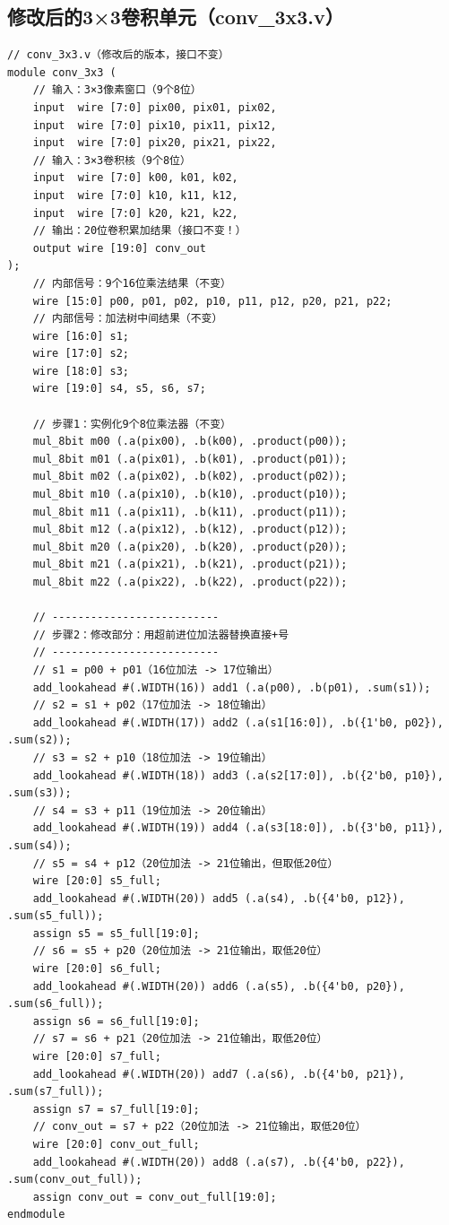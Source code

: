 \documentclass{ctexart}
\begin{document}
\subsection{修改后的3×3卷积单元（conv\_3x3.v）}
\begin{lstlisting}[style=verilog, caption=conv\_3x3.v]
// conv_3x3.v（修改后的版本，接口不变）
module conv_3x3 (
    // 输入：3×3像素窗口（9个8位）
    input  wire [7:0] pix00, pix01, pix02,
    input  wire [7:0] pix10, pix11, pix12,
    input  wire [7:0] pix20, pix21, pix22,
    // 输入：3×3卷积核（9个8位）
    input  wire [7:0] k00, k01, k02,
    input  wire [7:0] k10, k11, k12,
    input  wire [7:0] k20, k21, k22,
    // 输出：20位卷积累加结果（接口不变！）
    output wire [19:0] conv_out
);
    // 内部信号：9个16位乘法结果（不变）
    wire [15:0] p00, p01, p02, p10, p11, p12, p20, p21, p22;
    // 内部信号：加法树中间结果（不变）
    wire [16:0] s1;
    wire [17:0] s2;
    wire [18:0] s3;
    wire [19:0] s4, s5, s6, s7;

    // 步骤1：实例化9个8位乘法器（不变）
    mul_8bit m00 (.a(pix00), .b(k00), .product(p00));
    mul_8bit m01 (.a(pix01), .b(k01), .product(p01));
    mul_8bit m02 (.a(pix02), .b(k02), .product(p02));
    mul_8bit m10 (.a(pix10), .b(k10), .product(p10));
    mul_8bit m11 (.a(pix11), .b(k11), .product(p11));
    mul_8bit m12 (.a(pix12), .b(k12), .product(p12));
    mul_8bit m20 (.a(pix20), .b(k20), .product(p20));
    mul_8bit m21 (.a(pix21), .b(k21), .product(p21));
    mul_8bit m22 (.a(pix22), .b(k22), .product(p22));

    // --------------------------
    // 步骤2：修改部分：用超前进位加法器替换直接+号
    // --------------------------
    // s1 = p00 + p01（16位加法 -> 17位输出）
    add_lookahead #(.WIDTH(16)) add1 (.a(p00), .b(p01), .sum(s1));
    // s2 = s1 + p02（17位加法 -> 18位输出）
    add_lookahead #(.WIDTH(17)) add2 (.a(s1[16:0]), .b({1'b0, p02}), .sum(s2));
    // s3 = s2 + p10（18位加法 -> 19位输出）
    add_lookahead #(.WIDTH(18)) add3 (.a(s2[17:0]), .b({2'b0, p10}), .sum(s3));
    // s4 = s3 + p11（19位加法 -> 20位输出）
    add_lookahead #(.WIDTH(19)) add4 (.a(s3[18:0]), .b({3'b0, p11}), .sum(s4));
    // s5 = s4 + p12（20位加法 -> 21位输出，但取低20位）
    wire [20:0] s5_full;
    add_lookahead #(.WIDTH(20)) add5 (.a(s4), .b({4'b0, p12}), .sum(s5_full));
    assign s5 = s5_full[19:0];
    // s6 = s5 + p20（20位加法 -> 21位输出，取低20位）
    wire [20:0] s6_full;
    add_lookahead #(.WIDTH(20)) add6 (.a(s5), .b({4'b0, p20}), .sum(s6_full));
    assign s6 = s6_full[19:0];
    // s7 = s6 + p21（20位加法 -> 21位输出，取低20位）
    wire [20:0] s7_full;
    add_lookahead #(.WIDTH(20)) add7 (.a(s6), .b({4'b0, p21}), .sum(s7_full));
    assign s7 = s7_full[19:0];
    // conv_out = s7 + p22（20位加法 -> 21位输出，取低20位）
    wire [20:0] conv_out_full;
    add_lookahead #(.WIDTH(20)) add8 (.a(s7), .b({4'b0, p22}), .sum(conv_out_full));
    assign conv_out = conv_out_full[19:0];
endmodule
\end{lstlisting}
\end{document}
